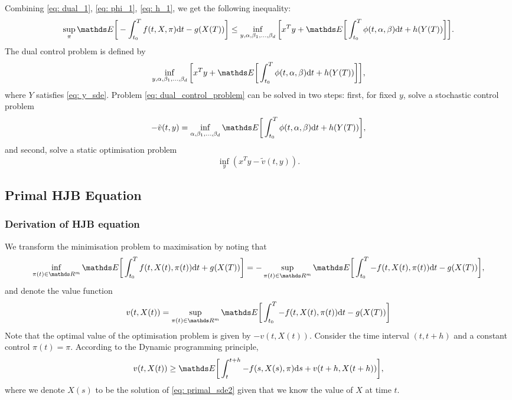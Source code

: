 Combining \eqref{eq: dual_1}, \eqref{eq: phi_1}, \eqref{eq: h_1}, we get the following inequality:
\begin{equation}
    \sup_\pi \E \bigg[ -\int_{t_0}^T f(t, X,\pi) \d t - g(X(T)) \bigg] \le \inf_{y, \alpha, \beta_1, \dots, \beta_d} \bigg[ x^T y + \E\bigg[\int_{t_0}^T \phi(t,\alpha, \beta ) \d t + h(Y(T)) \bigg] \bigg]. \label{eq: dual_primal_inequality}
\end{equation}
The dual control problem is defined by
\begin{equation}
    \inf_{y, \alpha, \beta_1, \dots, \beta_d} \bigg[ x^T y + \E\bigg[\int_{t_0}^T \phi(t,\alpha, \beta ) \d t + h(Y(T)) \bigg] \bigg], \label{eq: dual_control_problem}
\end{equation}
where $Y$ satisfies \eqref{eq: y_sde}. Problem \eqref{eq: dual_control_problem} can be solved in two steps: first, for fixed $y$, solve a stochastic control problem
\begin{equation}
    - \tilde{v}(t, y) = \inf_{ \alpha, \beta_1, \dots, \beta_d} \E\bigg[\int_{t_0}^T \phi (t, \alpha, \beta) \d t + h(Y(T)) \bigg], \label{eq: dual_value_function}
\end{equation}
and second, solve a static optimisation problem
\begin{equation*}
    \inf_y (x^T y - \tilde{v}(t, y)).
\end{equation*}
\newpage
\subsection{Primal HJB Equation}

\subsubsection{Derivation of HJB equation}
We transform the minimisation problem to maximisation by noting that
\begin{equation*}
     \inf_{\pi(t) \in \R^m} \E \bigg[ \int_{t_0}^T f(t, X(t), \pi(t)) \d t + g(X(T))\bigg] = - \sup_{\pi(t) \in \R^m} \E \bigg[ \int_{t_0}^T - f(t, X(t), \pi(t)) \d t - g(X(T))\bigg],
\end{equation*}
and denote the value function 
\begin{equation}
    v(t, X(t)) = \sup_{\pi(t) \in \R^m} \E \bigg[ \int_{t_0}^T - f(t, X(t), \pi(t)) \d t - g(X(T))\bigg]
\end{equation}
Note that the optimal value of the optimisation problem is given by $-v(t,X(t))$. Consider the time interval $(t, t + h)$ and a constant control $\pi(t) = \pi$. According to the Dynamic programming principle,
\begin{equation}
    v(t, X(t)) \ge \E \bigg[ \int_{t}^{t+h} - f(s, X(s), \pi) \d s + v(t+h, X(t + h)) \bigg],
    \label{eq: 1}
\end{equation}
where we denote $X(s)$ to be the solution of \eqref{eq: primal_sde2} given that we know the value of $X$ at time $t$.\\

